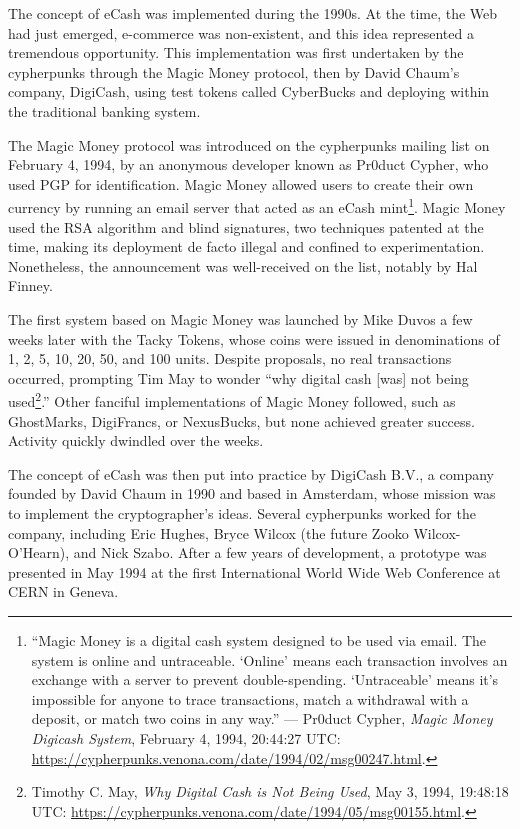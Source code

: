 \documentclass[
  a5paper,
  smalldemyvopaper,10pt,twoside,onecolumn,openright,extrafontsizes,hidelinks]{memoir}
\begin{document}

The concept of eCash was implemented during the 1990s. At the time, the
Web had just emerged, e-commerce was non-existent, and this idea
represented a tremendous opportunity. This implementation was first
undertaken by the cypherpunks through the Magic Money protocol, then by
David Chaum's company, DigiCash, using test tokens called CyberBucks and
deploying within the traditional banking system.

The Magic Money protocol was introduced on the cypherpunks mailing list
on February 4, 1994, by an anonymous developer known as Pr0duct Cypher,
who used PGP for identification. Magic Money allowed users to create
their own currency by running an email server that acted as an eCash
mint\footnote{``Magic Money is a digital cash system designed to be used
  via email. The system is online and untraceable. `Online' means each
  transaction involves an exchange with a server to prevent
  double-spending. `Untraceable' means it's impossible for anyone to
  trace transactions, match a withdrawal with a deposit, or match two
  coins in any way.'' --- Pr0duct Cypher, \emph{Magic Money Digicash
  System}, February 4, 1994, 20:44:27 UTC:
  \url{https://cypherpunks.venona.com/date/1994/02/msg00247.html}.}.
Magic Money used the RSA algorithm and blind signatures, two techniques
patented at the time, making its deployment de facto illegal and
confined to experimentation. Nonetheless, the announcement was
well-received on the list, notably by Hal Finney.

The first system based on Magic Money was launched by Mike Duvos a few
weeks later with the Tacky Tokens, whose coins were issued in
denominations of 1, 2, 5, 10, 20, 50, and 100 units. Despite proposals,
no real transactions occurred, prompting Tim May to wonder ``why digital
cash {[}was{]} not being used\footnote{Timothy C. May, \emph{Why Digital
  Cash is Not Being Used}, May 3, 1994, 19:48:18 UTC:
  \url{https://cypherpunks.venona.com/date/1994/05/msg00155.html}.}.''
Other fanciful implementations of Magic Money followed, such as
GhostMarks, DigiFrancs, or NexusBucks, but none achieved greater
success. Activity quickly dwindled over the weeks.

The concept of eCash was then put into practice by DigiCash B.V., a
company founded by David Chaum in 1990 and based in Amsterdam, whose
mission was to implement the cryptographer's ideas. Several cypherpunks
worked for the company, including Eric Hughes, Bryce Wilcox (the future
Zooko Wilcox-O'Hearn), and Nick Szabo. After a few years of development,
a prototype was presented in May 1994 at the first International World
Wide Web Conference at CERN in Geneva.
\end{document}
